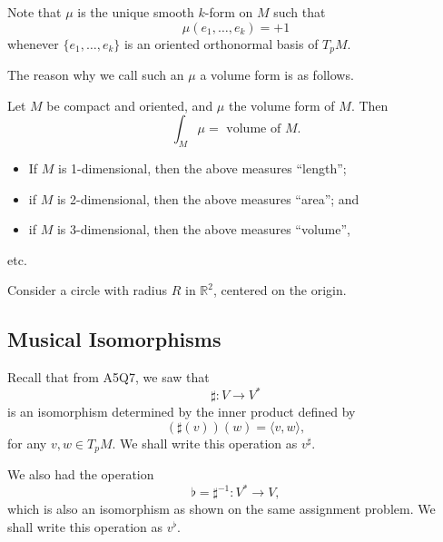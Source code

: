 \documentclass[notoc,notitlepage]{tufte-book}
\begin{document}
\begin{note}
  Note that $\mu$ is the unique smooth $k$-form on $M$ such that
  \begin{equation*}
    \mu(e_1, \ldots, e_k) = +1
  \end{equation*}
  whenever $\{ e_1, \ldots, e_k \}$ is an oriented orthonormal basis of $T_p M$.
\end{note}

The reason why we call such an $\mu$ a volume form is as follows.

\begin{note}
  Let $M$ be compact and oriented, and $\mu$ the volume form of $M$. Then
  \begin{equation*}
    \int_{M} \mu = \text{ volume of } M.
  \end{equation*}
  \begin{itemize}
    \item If $M$ is 1-dimensional, then the above measures ``length'';
    \item if $M$ is 2-dimensional, then the above measures ``area''; and
    \item if $M$ is 3-dimensional, then the above measures ``volume'',
  \end{itemize}
  etc.
\end{note}

\begin{eg}

  Consider a circle with radius $R$ in $\mathbb{R}^2$, centered on the origin.
\end{eg}


\subsection{Musical Isomorphisms}%
\label{sub:musical_isomorphisms}

Recall that from A5Q7, we saw that
\begin{equation*}
  \sharp : V \to V^*
\end{equation*}
is an isomorphism determined by the inner product defined by
\begin{equation*}
  (\sharp(v))(w) = \langle v, w \rangle,
\end{equation*}
for any $v, w \in T_p M$. We shall write this operation as $v^\sharp$.

We also had the operation
\begin{equation*}
  \flat = \sharp^{-1} : V^* \to V,
\end{equation*}
which is also an isomorphism as shown on the same assignment problem. We shall
write this operation as $v^\flat$.
\end{document}
